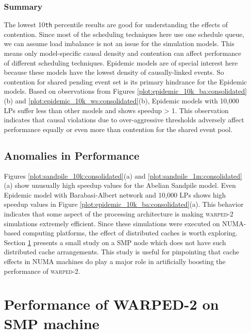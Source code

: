 \documentclass[11pt]{book}
\begin{document}
\subsubsection{Summary}
\label{subsubsec:summary_worst}
The lowest 10\texttt{th} percentile results are good for understanding the effects of contention.
Since most of the scheduling techniques here use one schedule queue, we can assume load imbalance is
not an issue for the simulation models. This means only model-specific causal density and contention
can affect performance of different scheduling techniques. Epidemic models are of special interest here
because these models have the lowest density of causally-linked events. So contention for shared pending
event set is its primary hindrance for the Epidemic models. Based on observations from Figures
\ref{plot:epidemic_10k_ba:consolidated}(b) and \ref{plot:epidemic_10k_ws:consolidated}(b), Epidemic
models with 10,000 LPs suffer less than other models and shows speedup > 1. This observation indicates
that causal violations due to over-aggressive thresholds adversely affect performance equally or even
more than contention for the shared event pool.

\subsection{Anomalies in Performance}
\label{subsec:anomalies}

Figures \ref{plot:sandpile_10k:consolidated}(a) and \ref{plot:sandpile_1m:consolidated}(a) show unusually
high speedup values for the Abelian Sandpile model. Even Epidemic model with Barabasi-Albert network and
10,000 LPs shows high speedup values in Figure \ref{plot:epidemic_10k_ba:consolidated}(a). This behavior
indicates that some aspect of the processing architecture is making \textsc{warped-2} simulations extremely
efficient. Since these simulations were executed on NUMA-based computing platforms, the effect of distributed
caches is worth exploring. Section \ref{sec:smp_performance} presents a small study on a SMP node which
does not have such distributed cache arrangements. This study is useful for pinpointing that cache effects
in NUMA machines do play a major role in artificially boosting the performance of \textsc{warped-2}.

\section[WARPED-2 on SMP]{Performance of WARPED-2 on SMP machine}
\label{sec:smp_performance}
\end{document}
